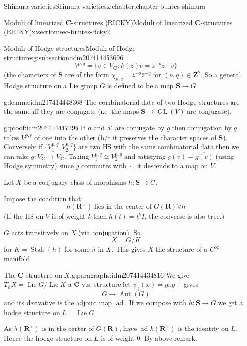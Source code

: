 \documentclass[oneside,10pt,]{book}
\numberwithin{equation}{section}
\DeclareMathOperator{\Lie}{Lie}
\newcommand{\inv}{^{-1}}
\newcommand{\ZZ}{\mathbf{Z}}
\newcommand{\RR}{\mathbf{R}}
\newcommand{\CC}{\mathbf{C}}
\DeclareMathOperator{\Stab}{Stab}
\DeclareMathOperator{\ad}{ad}
\DeclareMathOperator{\Aut}{Aut}
\DeclareMathOperator{\GL}{GL}
\begin{document}
\begin{chapterptx}{Shimura varieties}{}{Shimura varieties}{}{}{x:chapter:chapter-buntes-shimura}
\begin{sectionptx}{Moduli of linearized \(\CC\)-structures (RICKY)}{}{Moduli of linearized \(\CC\)-structures (RICKY)}{}{}{x:section:sec-buntes-ricky2}
\begin{subsectionptx}{Moduli of Hodge structures}{}{Moduli of Hodge structures}{}{}{g:subsection:idm207414453696}
\begin{equation*}
V^{p,q} = \{ v \in V_\CC : h(z) v= z^{-p} \bar z ^{-q} v\}
\end{equation*}
(the characters of \(\mathbf S\) are of the form \(\chi_{p,q} = z^{-p} \bar z ^{-q}\) for \((p,q)\in \ZZ^2\). So a general Hodge structure on a Lie group  \(G\) is defined to be a map \(\mathbf S \to G\).%
\begin{lemma}{}{}{g:lemma:idm207414448368}%
The combinatorial data of two Hodge structures are the same iff they are conjugate (i.e. the maps \(\mathbf S \to \GL(V)\) are conjugate).%
\end{lemma}
\begin{proofptx}{}{g:proof:idm207414447296}
If \(h\) and \(h'\) are conjugate by \(g\) then conjugation by \(g\) takes \(V^{p,q}\) of one into the other (b\slash{}c it preserves the character spaces of \(\mathbf S\)). Conversely if \(\{V_1^{p,q}, V_2^{p,q}\}\) are two HS with the same combinatorial data then we can take \(g \colon V_{\CC} \to V_{\CC}\). Taking \(V_1^{p,q} \cong V_2^{p,q}\) and satisfying \(g(\bar v) = \overline{g(v)}\) (using Hodge symmetry) since \(g\) commutes with \(\bar \cdot\), it descends to a  map on \(V\).%
\end{proofptx}
Let  \(X\) be a conjugacy class of morphisms \(h\colon \mathbf S \to G\).%
\par
Impose the condition that:%
\begin{equation}
h(\RR^\times) \text{ lies in the center of }G(\RR) \forall h\label{g:men:idm207414439936}
\end{equation}
(If the HS on \(V\) is of weight \(k\) then \(h(t) = t^k I\), the converse is also true.)%
\par
\(G\) acts transitively on \(X\) (via conjugation). So%
\begin{equation*}
X=  G/K
\end{equation*}
for \(K = \Stab(h) \) for some \(h\) in \(X\). This gives \(X\) the structure of a \(C^\infty\)-manifold.%
\begin{paragraphs}{The \(\CC\)-structure on \(X\).}{g:paragraphs:idm207414434816}%
We give \(T_hX = \Lie G / \Lie K\) a \(\CC\)-v.s. structure let \(\psi_g (x)  = g x g \inv\) gives%
\begin{equation*}
G\to \Aut(G)
\end{equation*}
and its derivative is the adjoint map \(\ad\). If we compose with \(h \colon \mathbf S\to G\) we get a hodge structure on \(L=  \Lie G\).%
\par
As \(h(\RR^\times)\) is in the center of \(G(\RR)\), have \(\ad h(\RR^\times)\) is the identity on \(L\). Hence the hodge structure on \(L\) is of weight 0. By above remark.%

\end{paragraphs}
\end{subsectionptx}
\end{sectionptx}
\end{chapterptx}
\end{document}
